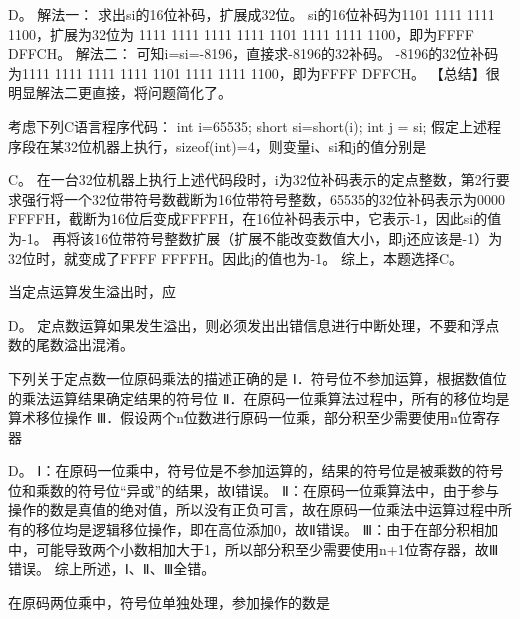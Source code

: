 \par{}
\begin{solution}D。 解法一： 求出si的16位补码，扩展成32位。 si的16位补码为1101 1111 1111
1100，扩展为32位为 1111 1111 1111 1111 1101 1111 1111 1100，即为FFFF
DFFCH。 解法二： 可知i=si=-8196，直接求-8196的32补码。
-8196的32位补码为1111 1111 1111 1111 1101 1111 1111 1100，即为FFFF
DFFCH。 【总结】很明显解法二更直接，将问题简化了。
\end{solution}
\question 考虑下列C语言程序代码： int i=65535; short si=short(i); int j = si;
假定上述程序段在某32位机器上执行，sizeof(int)=4，则变量i、si和j的值分别是
\par{}
\begin{solution}C。
在一台32位机器上执行上述代码段时，i为32位补码表示的定点整数，第2行要求强行将一个32位带符号数截断为16位带符号整数，65535的32位补码表示为0000
FFFFH，截断为16位后变成FFFFH，在16位补码表示中，它表示-1，因此si的值为-1。
再将该16位带符号整数扩展（扩展不能改变数值大小，即j还应该是-1）为32位时，就变成了FFFF
FFFFH。因此j的值也为-1。 综上，本题选择C。
\end{solution}
\question 当定点运算发生溢出时，应
\par{}
\begin{solution}D。
定点数运算如果发生溢出，则必须发出出错信息进行中断处理，不要和浮点数的尾数溢出混淆。
\end{solution}
\question 下列关于定点数一位原码乘法的描述正确的是
Ⅰ．符号位不参加运算，根据数值位的乘法运算结果确定结果的符号位
Ⅱ．在原码一位乘算法过程中，所有的移位均是算术移位操作
Ⅲ．假设两个n位数进行原码一位乘，部分积至少需要使用n位寄存器
\par{}
\begin{solution}D。
Ⅰ：在原码一位乘中，符号位是不参加运算的，结果的符号位是被乘数的符号位和乘数的符号位``异或''的结果，故Ⅰ错误。
Ⅱ：在原码一位乘算法中，由于参与操作的数是真值的绝对值，所以没有正负可言，故在原码一位乘法中运算过程中所有的移位均是逻辑移位操作，即在高位添加0，故Ⅱ错误。
Ⅲ：由于在部分积相加中，可能导致两个小数相加大于1，所以部分积至少需要使用n+1位寄存器，故Ⅲ错误。
综上所述，Ⅰ、Ⅱ、Ⅲ全错。
\end{solution}
\question 在原码两位乘中，符号位单独处理，参加操作的数是
\par{}
